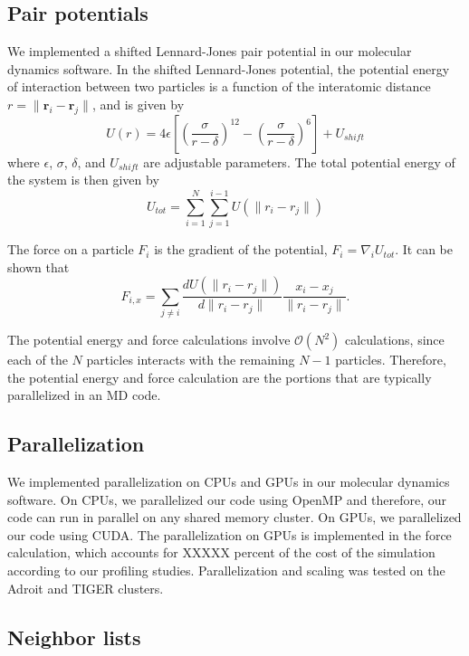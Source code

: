 \subsection{Pair potentials} \label{subsec:potential}

We implemented a shifted Lennard-Jones pair potential in our molecular dynamics software.
%
In the shifted Lennard-Jones potential, the potential energy of interaction between two particles is a function of the interatomic distance $r = \|\mathbf{r}_i - \mathbf{r}_j \|$, and is given by
\begin{equation}
U(r) = 4 \epsilon\left[ \left( \frac{\sigma}{r-\delta} \right)^{12} - \left( \frac{\sigma}{r-\delta} \right)^6 \right] + U_{shift}
\end{equation}
where $\epsilon$, $\sigma$, $\delta$, and $U_{shift}$ are adjustable parameters.
%
The total potential energy of the system is then given by
\begin{equation}
U_{tot} = \sum_{i=1}^{N} \sum_{j=1}^{i-1} U\left( \| r_i - r_j \| \right)
\end{equation}

The force on a particle $F_i$ is the gradient of the potential, $F_i = \nabla_i U_{tot}$.
%
It can be shown that
\begin{equation}
F_{i, x} = \sum_{j \ne i} \frac{d U\left( \| r_i - r_j \| \right)}{d \| r_i - r_j \| } \frac{x_i - x_j}{\|r_i - r_j\|}.
\end{equation}

The potential energy and force calculations involve $\mathcal{O}(N^2)$ calculations, since each of the $N$ particles interacts with the remaining $N-1$ particles.
%
Therefore, the potential energy and force calculation are the portions that are typically parallelized in an MD code.

\subsection{Parallelization}

We implemented parallelization on CPUs and GPUs in our molecular dynamics software.
%
On CPUs, we parallelized our code using OpenMP and therefore, our code can run in parallel on any shared memory cluster.
%
On GPUs, we parallelized our code using CUDA.
The parallelization on GPUs is implemented in the force calculation, which accounts for XXXXX percent of the cost of the simulation according to our profiling studies.
%
Parallelization and scaling was tested on the Adroit and TIGER clusters.
\subsection{Neighbor lists}

